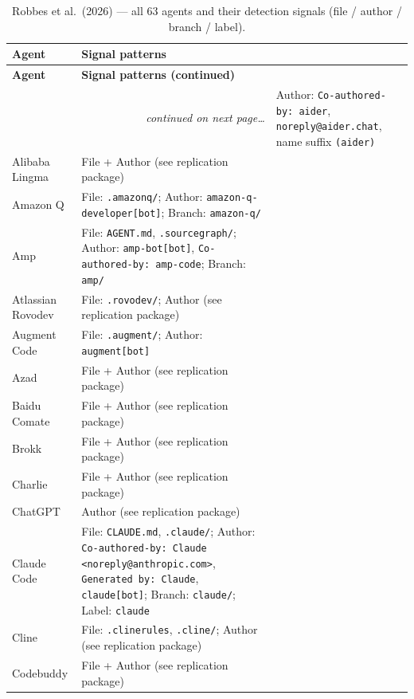 \begin{small}
\begin{longtable}{@{}p{3.0cm}p{11.5cm}@{}}
\caption[Robbes et al.\ (2026) agent signal catalogue]{Robbes et al.\ (2026) --- all 63 agents and their detection signals (file / author / branch / label).}
\label{tab:paper-agents}\\
\toprule
\textbf{Agent} & \textbf{Signal patterns} \\
\midrule\endfirsthead
\toprule\textbf{Agent} & \textbf{Signal patterns (continued)}\\\midrule\endhead
\midrule\multicolumn{2}{r}{\footnotesize\textit{continued on next page\ldots}}\endfoot
\bottomrule\endlastfoot

Aider            & Author: \texttt{Co-authored-by: aider}, \texttt{noreply@aider.chat}, name suffix \texttt{(aider)} \\
Alibaba Lingma   & File + Author (see replication package) \\
Amazon Q         & File: \texttt{.amazonq/}; Author: \texttt{amazon-q-developer[bot]}; Branch: \texttt{amazon-q/} \\
Amp              & File: \texttt{AGENT.md}, \texttt{.sourcegraph/}; Author: \texttt{amp-bot[bot]}, \texttt{Co-authored-by: amp-code}; Branch: \texttt{amp/} \\
Atlassian Rovodev & File: \texttt{.rovodev/}; Author (see replication package) \\
Augment Code     & File: \texttt{.augment/}; Author: \texttt{augment[bot]} \\
Azad             & File + Author (see replication package) \\
Baidu Comate     & File + Author (see replication package) \\
Brokk            & File + Author (see replication package) \\
Charlie          & File + Author (see replication package) \\
ChatGPT          & Author (see replication package) \\
Claude Code      & File: \texttt{CLAUDE.md}, \texttt{.claude/}; Author: \texttt{Co-authored-by: Claude <noreply@anthropic.com>}, \texttt{Generated by: Claude}, \texttt{claude[bot]}; Branch: \texttt{claude/}; Label: \texttt{claude} \\
Cline            & File: \texttt{.clinerules}, \texttt{.cline/}; Author (see replication package) \\
Codebuddy        & File + Author (see replication package) \\

\end{longtable}
\end{small}
